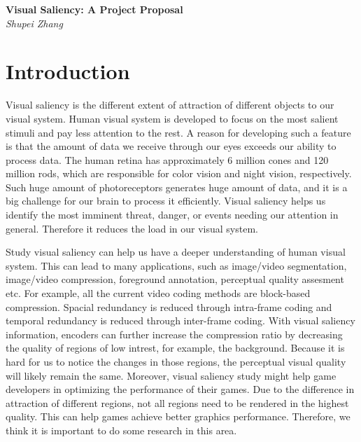 \documentclass[12pt]{article}
\begin{document}
\begin{center}
{\bf \Large Visual Saliency: A Project Proposal}  \\
\vspace{.1in}
{\em Shupei Zhang}
\end{center}
\section{Introduction}
Visual saliency is the different extent of attraction of different objects to our visual system. Human visual system
is developed to focus on the most salient stimuli and pay less attention to the rest. A reason for developing such a 
feature is that the amount of data we receive through our eyes exceeds our ability to process data. 
The human retina has approximately 6 million cones and 120 million rods\cite{PhotoreceptorCell2021}, which are responsible for color vision 
and night vision, respectively. Such huge amount of photoreceptors generates huge amount of data, and it is a big challenge for our brain to 
process it efficiently.
Visual saliency helps us identify the most imminent threat, danger, or events needing our attention in general. Therefore it reduces 
the load in our visual system.

Study visual saliency can help us have a deeper understanding of human visual system. This can lead to many applications, such as
image/video segmentation, image/video compression, foreground annotation, perceptual quality assesment etc\cite{congReviewVisualSaliency2019}.
For example, all the current video coding methods are block-based compression. Spacial redundancy is reduced through intra-frame coding and temporal 
redundancy is reduced through inter-frame coding\cite{sullivanOverviewHighEfficiency2012}. With visual saliency information, encoders can further increase
the compression ratio by decreasing the quality of regions of low intrest, for example, the background. Because it is hard for us to notice the changes in those regions,
the perceptual visual quality will likely remain the same. Moreover, visual saliency study might help game developers in optimizing the performance 
of their games. Due to the difference in attraction of different regions, not all regions need to be rendered in the highest quality.
This can help games achieve better graphics performance. Therefore, we think it is important to do some research in this area.
\end{document}
